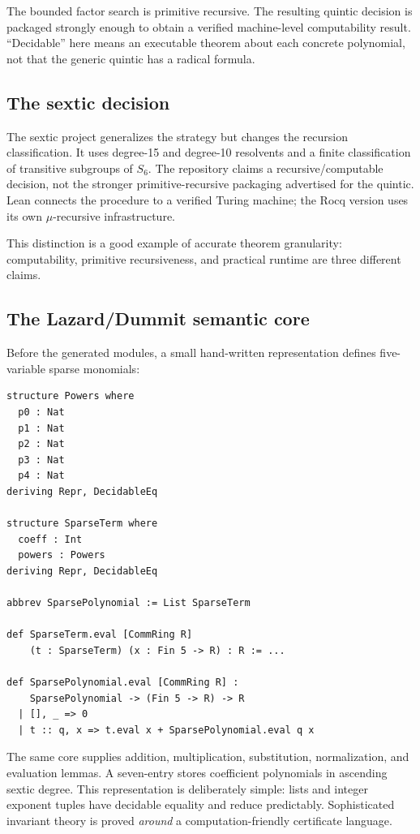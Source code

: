 \documentclass[
  10pt,
  a4paper,
  twoside,
  open=any,
  parskip=half,
  headings=big
]{scrreprt}
\newcommand{\code}[1]{\texttt{\detokenize{#1}}}
\begin{document}
The bounded factor search is primitive recursive.  The resulting quintic
decision is packaged strongly enough to obtain a verified machine-level
computability result.  ``Decidable'' here means an executable theorem about
each concrete polynomial, not that the generic quintic has a radical formula.

\subsection{The sextic decision}

The sextic project generalizes the strategy but changes the recursion
classification.  It uses degree-15 and degree-10 resolvents and a finite
classification of transitive subgroups of \(S_6\).  The repository claims a
recursive/computable decision, not the stronger primitive-recursive packaging
advertised for the quintic.  Lean connects the procedure to a verified Turing
machine; the Rocq version uses its own \(\mu\)-recursive infrastructure.

This distinction is a good example of accurate theorem granularity:
computability, primitive recursiveness, and practical runtime are three
different claims.

\subsection{The Lazard/Dummit semantic core}

Before the generated modules, a small hand-written representation defines
five-variable sparse monomials:

\begin{lstlisting}[language=Lean,caption={Core sparse representation used by Dummit certificates.}]
structure Powers where
  p0 : Nat
  p1 : Nat
  p2 : Nat
  p3 : Nat
  p4 : Nat
deriving Repr, DecidableEq

structure SparseTerm where
  coeff : Int
  powers : Powers
deriving Repr, DecidableEq

abbrev SparsePolynomial := List SparseTerm

def SparseTerm.eval [CommRing R]
    (t : SparseTerm) (x : Fin 5 -> R) : R := ...

def SparsePolynomial.eval [CommRing R] :
    SparsePolynomial -> (Fin 5 -> R) -> R
  | [], _ => 0
  | t :: q, x => t.eval x + SparsePolynomial.eval q x
\end{lstlisting}

The same core supplies addition, multiplication, substitution, normalization,
and evaluation lemmas.  A seven-entry \code{dummitTable} stores coefficient
polynomials in ascending sextic degree.  This representation is deliberately
simple: lists and integer exponent tuples have decidable equality and reduce
predictably.  Sophisticated invariant theory is proved \emph{around} a
computation-friendly certificate language.
\end{document}

